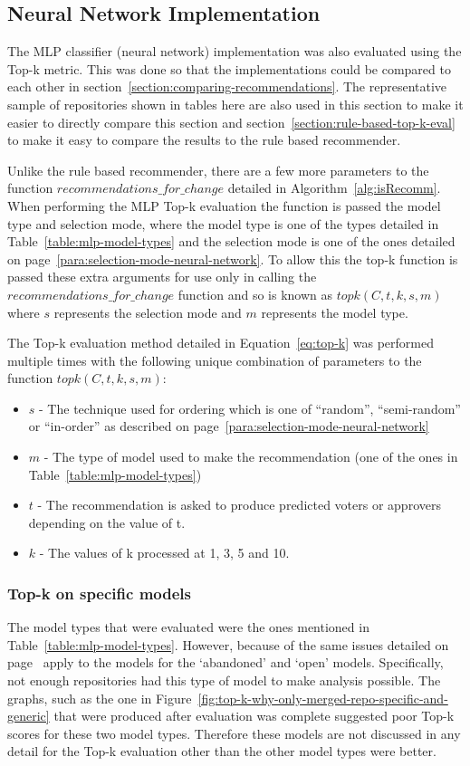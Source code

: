 \subsection{Neural Network Implementation}

The MLP classifier (neural network) implementation was also evaluated using the Top-k metric. This was done so that the implementations could be compared to each other in section~\ref{section:comparing-recommendations}. The representative sample of repositories shown in tables here are also used in this section to make it easier to directly compare this section and section~\ref{section:rule-based-top-k-eval} to make it easy to compare the results to the rule based recommender.

Unlike the rule based recommender, there are a few more parameters to the function $recommendations\_for\_change$ detailed in Algorithm~\ref{alg:isRecomm}. When performing the MLP Top-k evaluation the function is passed the model type and selection mode, where the model type is one of the types detailed in Table~\ref{table:mlp-model-types} and the selection mode is one of the ones detailed on page~\ref{para:selection-mode-neural-network}. To allow this the top-k function is passed these extra arguments for use only in calling the $recommendations\_for\_change$ function and so is known as \(topk(C, t, k, s, m)\) where \(s\) represents the selection mode and \(m\) represents the model type.

The Top-k evaluation method detailed in Equation~\ref{eq:top-k} was performed multiple times with the following unique combination of parameters to the function \(topk(C, t, k, s, m)\):
\begin{itemize}
    \item \(s\) - The technique used for ordering which is one of ``random'', ``semi-random'' or ``in-order'' as described on page~\ref{para:selection-mode-neural-network}
    \item \(m\) - The type of model used to make the recommendation (one of the ones in Table~\ref{table:mlp-model-types})
    \item \(t\) - The recommendation is asked to produce predicted voters or approvers depending on the value of t.
    \item \(k\) - The values of k processed at 1, 3, 5 and 10.
\end{itemize}

\subsubsection{Top-k on specific models}
The model types that were evaluated were the ones mentioned in Table~\ref{table:mlp-model-types}. However, because of the same issues detailed on page~\pageref{para:evaluation-top-k-only-using-merged} apply to the models for the `abandoned' and `open' models. Specifically, not enough repositories had this type of model to make analysis possible. The graphs, such as the one in Figure~\ref{fig:top-k-why-only-merged-repo-specific-and-generic} that were produced after evaluation was complete suggested poor Top-k scores for these two model types. Therefore these models are not discussed in any detail for the Top-k evaluation other than the other model types were better.

